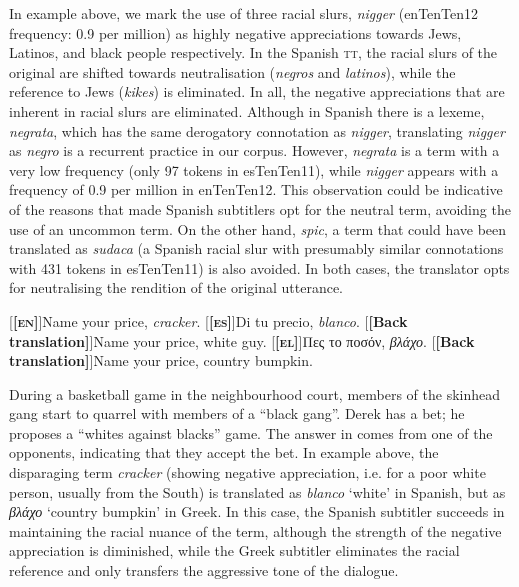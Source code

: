 \documentclass[output=paper]{LSP/langsci}
\begin{document}
In example  above, we mark the use of three racial slurs, \textit{nigger} (enTenTen12 frequency: 0.9 per million) as highly negative appreciations towards Jews, Latinos, and black people respectively. In the Spanish \textsc{tt}, the racial slurs of the original are shifted towards neutralisation (\textit{negros} and \textit{latinos}), while the reference to Jews (\textit{kikes}) is eliminated. In all, the negative appreciations that are inherent in racial slurs are eliminated. Although in Spanish there is a lexeme, \textit{negrata}, which has the same derogatory connotation as \textit{nigger}, translating \textit{nigger} as \textit{negro} is a recurrent practice in our corpus. However, \textit{negrata} is a term with a very low frequency (only 97 tokens in esTenTen11), while \textit{nigger} appears with a frequency of 0.9 per million in enTenTen12. This observation could be indicative of the reasons that made Spanish subtitlers opt for the neutral term, avoiding the use of an uncommon term. On the other hand, \textit{spic}, a term that could have been translated as \textit{sudaca} (a Spanish racial slur with presumably similar connotations with 431 tokens in esTenTen11) is also avoided. In both cases, the translator opts for neutralising the rendition of the original utterance.

\ea \label{ex:2:24}
\begin{xlist}
\exi{}[\textbf{[\textsc{en}]}]{Name your price, \emph{cracker}.}
\exi{}[\textbf{[\textsc{es}]}]{Di tu precio, \emph{blanco}.}
\exi{}[\textbf{[Back translation]}]{Name your price, white guy.}
\exi{}[\textbf{[\textsc{el}]}]{Πες το ποσόν, \emph{βλάχο}.}
\exi{}[\textbf{[Back translation]}]{Name your price, country bumpkin.}
\end{xlist}
\z

During a basketball game in the neighbourhood court, members of the skinhead gang start to quarrel with members of a “black gang”. Derek has a bet; he proposes a “whites against blacks” game. The answer in  comes from one of the opponents, indicating that they accept the bet.
In example  above, the disparaging term \textit{cracker} (showing negative appreciation, i.e. for a poor white person, usually from the South) is translated as \textit{blanco} `white' in Spanish, but as \textit{βλάχο} `country bumpkin' in Greek. In this case, the Spanish subtitler succeeds in maintaining the racial nuance of the term, although the strength of the negative appreciation is diminished, while the Greek subtitler eliminates the racial reference and only transfers the aggressive tone of the dialogue. 
\end{document}
